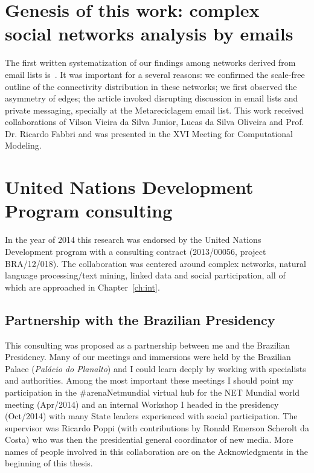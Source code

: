 \begin{apendicesenv}
\section{Genesis of this work: complex social networks analysis by emails}
The first written systematization of our findings among networks derived from email lists
is~\cite{comp1}.
It was important for a several reasons: we confirmed the scale-free outline of the connectivity distribution
in these networks;
we first observed the asymmetry of edges;
the article invoked disrupting discussion in email lists and private messaging, specially at the Metareciclagem email list.
This work received collaborations of Vilson Vieira da Silva Junior, Lucas da Silva Oliveira
and Prof. Dr. Ricardo Fabbri
and was presented in the XVI Meeting for Computational Modeling.

\section{United Nations Development Program consulting}\label{sec:undp}
In the year of 2014 this research was endorsed by the United Nations Development program
with a consulting contract (2013/00056, project BRA/12/018).
The collaboration was centered around complex networks,
natural language processing/text mining, linked data and social participation,
all of which are approached in Chapter~\ref{ch:int}.

\subsection{Partnership with the Brazilian Presidency}
This consulting was proposed as a partnership between me
and the Brazilian Presidency.
Many of our meetings and immersions were held by the Brazilian Palace (\emph{Palácio do Planalto})
and I could learn deeply by working with specialists and authorities.
Among the most important these meetings I should point
my participation in the \#arenaNetmundial virtual hub for the NET Mundial world meeting (Apr/2014)
and an internal Workshop I headed in the presidency (Oct/2014) with many State leaders experienced with social participation.
The supervisor was Ricardo Poppi (with contributions by Ronald Emerson Scherolt da Costa)
who was then the presidential general coordinator of new media.
More names of people involved in this collaboration are on the Acknowledgments in the beginning of this thesis.


\end{apendicesenv}
